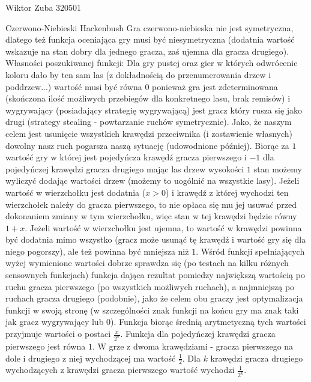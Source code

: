 \documentclass{article}
\begin{document}
Wiktor Zuba 320501\newline

Czerwono-Niebieski Hackenbush\newline
Gra czerwono-niebieska nie jest symetryczna, dlatego też funkcja oceniająca gry musi być niesymetryczna
(dodatnia wartość wskazuje na stan dobry dla jednego gracza, zaś ujemna dla gracza drugiego).\newline
Własności poszukiwanej funkcji:\newline
Dla gry pustej oraz gier w których odwrócenie koloru dało by ten sam las (z dokładnością do przenumerowania drzew i poddrzew...) wartość musi być równa $0$
ponieważ gra jest zdeterminowana (skończona ilość możliwych przebiegów dla konkretnego lasu, brak remisów) i wygrywający (posiadający strategię wygrywającą)
jest gracz który rusza się jako drugi (strategy stealing - powtarzanie ruchów symetrycznie).
Jako, że naszym celem jest usunięcie wszystkich krawędzi przeciwnika (i zostawienie własnych) dowolny nasz ruch pogarsza naszą sytuację (udowodnione później).
Biorąc za $1$ wartość gry w której jest pojedyńcza krawędź gracza pierwszego i $-1$ dla pojedyńczej krawędzi gracza drugiego mając las drzew wysokości $1$
stan możemy wyliczyć dodając wartości drzew (możemy to uogólnić na wszystkie lasy). Jeżeli wartość w wierzchołku jest dodatnia ($x>0$) i krawędź z której
wychodzi ten wierzchołek należy do gracza pierwszego, to nie opłaca się mu jej usuwać przed dokonaniem zmiany w tym wierzchołku,
więc stan w tej krawędzi będzie równy $1+x$. Jeżeli wartość w wierzchołku jest ujemna, to wartość w krawędzi powinna być dodatnia mimo wszystko
(gracz może usunąć tę krawędź i wartość gry się dla niego pogorszy), ale też powinna być mniejsza niż $1$.\newline
Wśród funkcji spełniających wyżej wymienione wartości dobrze sprawdza się (po testach na kilku różnych sensownych funkcjach) funkcja dająca rezultat pomiedzy
największą wartością po ruchu gracza pierwszego (po wszystkich możliwych ruchach), a najmniejszą po ruchach gracza drugiego (podobnie),
jako że celem obu graczy jest optymalizacja funkcji w swoją stronę (w szczególności znak funkcji na końcu gry ma znak taki jak gracz wygrywający lub $0$).
Funkcja biorąc średnią arytmetyczną tych wartości przyjmuje wartości o postaci $\frac{x}{2^n}$.
Funkcja dla pojedyńczej krawędzi gracza pierwszego jest równa $1$. W grze z dwoma krawędziami - gracza pierwszego na dole i drugiego z niej wychodzącej
ma wartość $\frac{1}{2}$. Dla $k$ krawędzi gracza drugiego wychodzących z krawędzi gracza pierwszego wartość wychodzi $\frac{1}{2^k}$.
\end{document}
